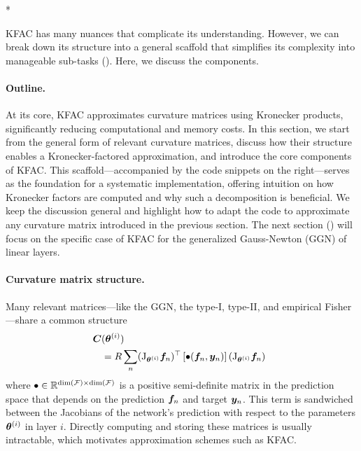 \switchcolumn[1]*
\switchcolumn[0]

KFAC has many nuances that complicate its understanding.
However, we can break down its structure into a general scaffold that simplifies its complexity into manageable sub-tasks ().
Here, we discuss the components.

\paragraph{Outline.} At its core, KFAC approximates curvature matrices using Kronecker products, significantly reducing computational and memory costs.
In this section, we start from the general form of relevant curvature matrices, discuss how their structure enables a Kronecker-factored approximation, and introduce the core components of KFAC.
This scaffold---accompanied by the code snippets on the right---serves as the foundation for a systematic implementation, offering intuition on how Kronecker factors are computed and why such a decomposition is beneficial.
We keep the discussion general and highlight how to adapt the code to approximate any curvature matrix introduced in the previous section.
The next section () will focus on the specific case of KFAC for the generalized Gauss-Newton (GGN) of linear layers.

\paragraph{Curvature matrix structure.} Many relevant matrices---like the GGN, the type-I, type-II, and empirical Fisher---share a common structure
\begin{align}\label{eq:common-structure}
  \begin{split}
    \!\!{\bm{C}}&({\bm{\theta}}^{(i)}) \\
           &= R \sum_n
             (\mathrm{J}_{{\bm{\theta}}^{(i)}} {\bm{f}}_n)^{\top}
             \left[ \bullet({\bm{f}}_n, {\bm{y}}_n) \right]
             (\mathrm{J}_{{\bm{\theta}}^{(i)}} {\bm{f}}_n)\,
  \end{split}
\end{align}
where $\bullet \in {\mathbb{R}}^{\dim({\mathcal{F}}) \times \dim({\mathcal{F}})}$ is a positive semi-definite matrix in the prediction space that depends on the prediction ${\bm{f}}_n$ and target ${\bm{y}}_n$.
This term is sandwiched between the Jacobians of the network's prediction with respect to the parameters ${\bm{\theta}}^{(i)}$ in layer $i$.
Directly computing and storing these matrices is usually intractable, which motivates approximation schemes such as KFAC.
